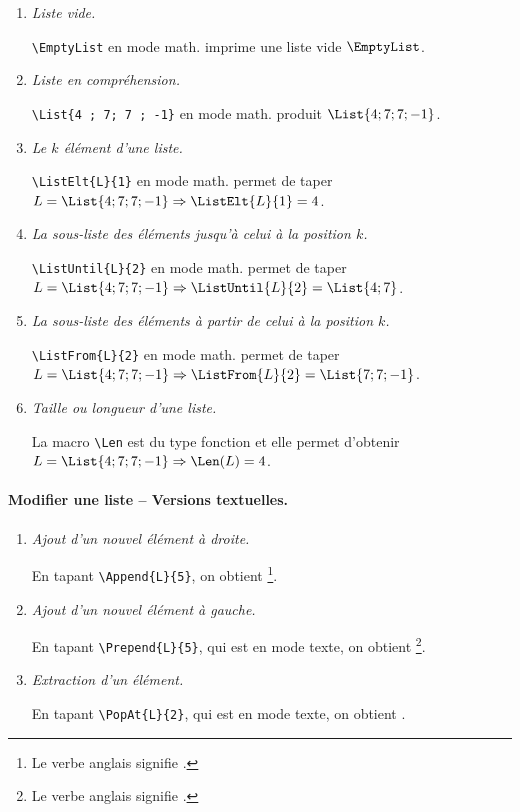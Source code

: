 \begin{enumerate}
	\item \textit{Liste vide.}

		  \verb+\EmptyList+ en mode math. imprime une liste vide $\EmptyList$.


	\item \textit{Liste en compréhension.}

		  \verb+\List{4 ; 7; 7 ; -1}+ en mode math. produit $\List{4 ; 7; 7 ; -1}$.


	\item \textit{Le $k$\ieme{} élément d'une liste.}

		  \verb+\ListElt{L}{1}+ en mode math. permet de taper $L = \List{4 ; 7; 7 ; -1} \Rightarrow \ListElt{L}{1} = 4$.


	\item \textit{La sous-liste des éléments jusqu'à celui à la position $k$.}

		  \verb+\ListUntil{L}{2}+ en mode math. permet de taper $L = \List{4 ; 7; 7 ; -1} \Rightarrow \ListUntil{L}{2} = \List{4 ; 7}$.


	\item \textit{La sous-liste des éléments à partir de celui à la position $k$.}

		  \verb+\ListFrom{L}{2}+ en mode math. permet de taper $L = \List{4 ; 7; 7 ; -1} \Rightarrow \ListFrom{L}{2} = \List{7 ; 7 ; -1}$.


	\item \textit{Taille ou longueur d'une liste.}

		  La macro \verb+\Len+ est du type fonction et elle permet d'obtenir $L = \List{4 ; 7; 7 ; -1} \Rightarrow \Len(L) = 4$.
\end{enumerate}



\paragraph{Modifier une liste -- Versions textuelles.}\phantom{XX}\smallskip

\begin{enumerate}
	\item \textit{Ajout d'un nouvel élément à droite.}

	      En tapant \verb+\Append{L}{5}+, on obtient 
	      \footnote{
		       Le verbe anglais  signifie .
		  }.


	\item \textit{Ajout d'un nouvel élément à gauche.}

	      En tapant \verb+\Prepend{L}{5}+, qui est en mode texte, on obtient 
	      \footnote{
		       Le verbe anglais  signifie .
		  }.


	\item \textit{Extraction d'un élément.}

	      En tapant \verb+\PopAt{L}{2}+, qui est en mode texte, on obtient .
\end{enumerate}



